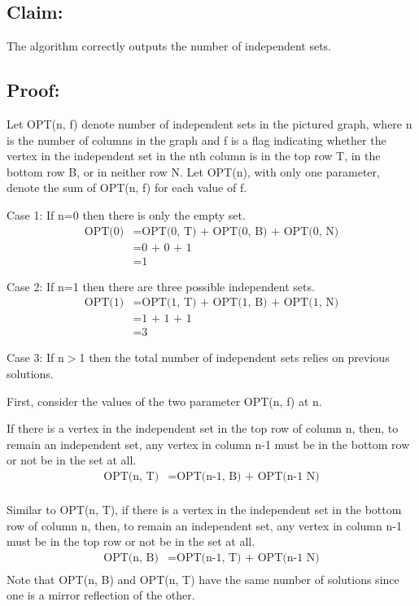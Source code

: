 \documentclass[11pt]{article}
\begin{document}
\subsection*{Claim:} 

The algorithm correctly outputs the number of independent sets.

\subsection*{Proof:}

Let OPT(n, f) denote number of independent sets in the pictured graph, where n is the number of columns in the graph and f is a flag indicating whether the vertex in the independent set in the nth column is in the top row T, in the bottom row B, or in neither row N. Let OPT(n), with only one parameter, denote the sum of OPT(n, f) for each value of f. 

Case 1: If n=0 then there is only the empty set. 
\begin{align*}
\text{OPT(0)} &= \text{OPT(0, T) + OPT(0, B) + OPT(0, N)} \\
	&= \text{0 + 0 + 1} \\
	&= \text{1}
\end{align*}

Case 2: If n=1 then there are three possible independent sets.
\begin{align*}
\text{OPT(1)} &= \text{OPT(1, T) + OPT(1, B) + OPT(1, N)} \\
	&= \text{1 + 1 + 1} \\
	&= \text{3}
\end{align*}

Case 3: If n$>$1 then the total number of independent sets relies on previous solutions. 

First, consider the values of the two parameter OPT(n, f) at n.

If there is a vertex in the independent set in the top row of column n, then, to remain an independent set, any vertex in column n-1 must be in the bottom row or not be in the set at all. 
\begin{align*}
\text{OPT(n, T)} &= \text{OPT(n-1, B) + OPT(n-1 N)} \\
\end{align*}

Similar to OPT(n, T), if there is a vertex in the independent set in the bottom row of column n, then, to remain an independent set, any vertex in column n-1 must be in the top row or not be in the set at all.
\begin{align*}
\text{OPT(n, B)} &= \text{OPT(n-1, T) + OPT(n-1 N)} \\
\end{align*}
Note that OPT(n, B) and OPT(n, T) have the same number of solutions since one is a mirror reflection of the other. 
\end{document}
